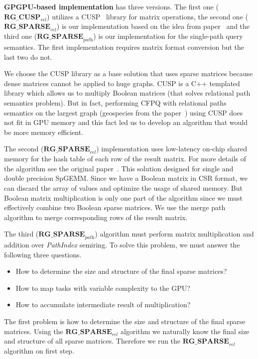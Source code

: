 \textbf{GPGPU-based implementation} has three versions.
The first one ($\textbf{RG\_CUSP}_{\textit{rel}}$) utilizes a CUSP~\cite{Cusp} library for matrix operations, the second one ($\textbf{RG\_SPARSE}_{\textit{rel}}$) is our implementation based on the idea from paper~\cite{NsparsePaper} and the third one ($\textbf{RG\_SPARSE}_{\textit{path}}$) is our implementation for the single-path query semantics.
The first implementation requires matrix format conversion but the last two do not.

We choose the CUSP library as a base solution that uses sparse matrices because dense matrices cannot be applied to huge graphs. CUSP is a C++ templated library which allows us to multiply Boolean matrices (that solves relational path semantics problem). But in fact, performing CFPQ with relational paths semantics on the largest graph (geospecies from the paper~\cite{Kuijpers:2019:ESC:3335783.3335791}) using CUSP does not fit in GPU memory and this fact led us to develop an algorithm that would be more memory efficient.

The second ($\textbf{RG\_SPARSE}_{\textit{rel}}$) implementation uses low-latency on-chip shared memory for the hash table of each row of the result matrix. For more details of the algorithm see the original paper~\cite{NsparsePaper}. This solution designed for single and double precision SpGEMM. Since we have a Boolean matrix in CSR format, we can discard the array of values and optimize the usage of shared memory. But Boolean matrix multiplication is only one part of the algorithm since we must effectively combine two Boolean sparse matrices. We use the merge path~\cite{GpuMergePathPaper} algorithm to merge corresponding rows of the result matrix.

The third ($\textbf{RG\_SPARSE}_{\textit{path}}$) algorithm must perform matrix multiplication and addition over \textit{PathIndex} semiring. To solve this problem, we must answer the following three questions. 

\begin{itemize}
  \item How to determine the size and structure of the final sparse matrices?
  \item How to map tasks with variable complexity to the GPU?
  \item How to accumulate intermediate result of multiplication?
\end{itemize}

The first problem is how to determine the size and structure of the final sparse matrices. Using the $\textbf{RG\_SPARSE}_{\textit{rel}}$ algorithm we naturally know the final size and structure of all sparse matrices. Therefore we run the $\textbf{RG\_SPARSE}_{\textit{rel}}$ algorithm on first step.

